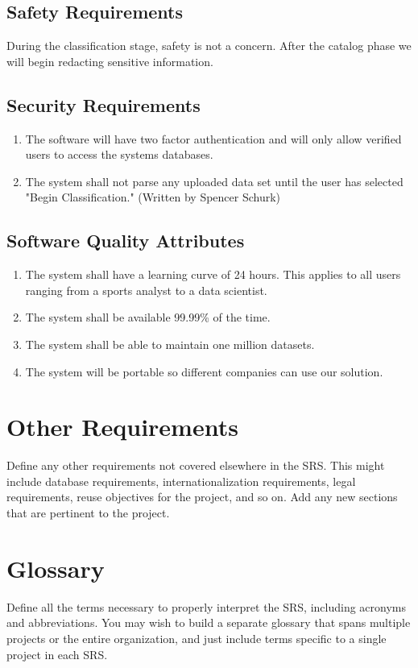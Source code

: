 \documentclass[12pt,oneside,letterpaper]{article}
\begin{document}
\subsection{Safety Requirements}
During the classification stage, safety is not a concern. After the catalog phase we will begin redacting sensitive information.
\subsection{Security Requirements}
\begin{enumerate}
    \item The software will have two factor authentication and will only allow verified users to access the systems databases.
    \item The system shall not parse any uploaded data set until the user has selected "Begin Classification." (Written by Spencer Schurk)
\end{enumerate}
\subsection{Software Quality Attributes}
\begin{enumerate}
    \item The system shall have a learning curve of 24 hours. This applies to all users ranging from a sports analyst to a data scientist.
    \item The system shall be available 99.99\% of the time.
    \item The system shall be able to maintain one million datasets.
    \item The system will be portable so different companies can use our solution.
\end{enumerate}


\section{Other Requirements}
Define any other requirements not covered elsewhere in the SRS. This might include database requirements, internationalization requirements, legal requirements, reuse objectives for the project, and so on. Add any new sections that are pertinent to the project.

\appendix
\section{Glossary}
Define all the terms necessary to properly interpret the SRS, including acronyms and abbreviations. You may wish to build a separate glossary that spans multiple projects or the entire organization, and just include terms specific to a single project in each SRS.
\end{document}
